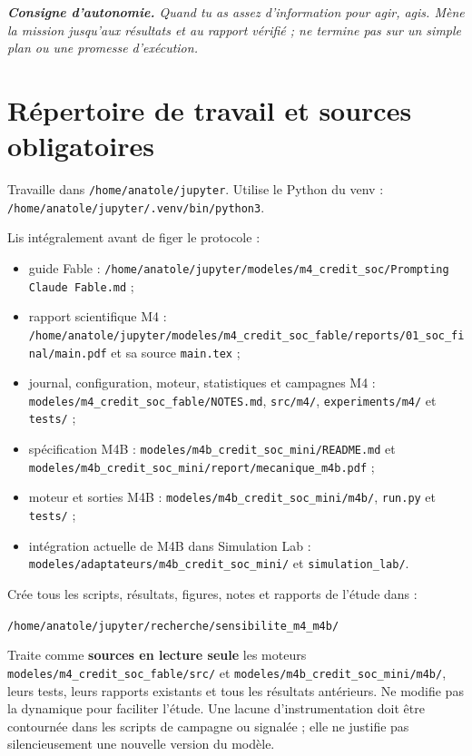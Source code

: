 \documentclass[11pt,a4paper]{article}
\newcommand{\code}[1]{\texttt{\color{navy}#1}}
\newcommand{\file}[1]{\nolinkurl{#1}}
\newcommand{\term}[1]{\textbf{\color{navy}#1}}
\newenvironment{notebox}
  {\begin{center}\begin{minipage}{0.90\textwidth}\color{navy}\itshape}
  {\end{minipage}\end{center}}
\begin{document}
\begin{notebox}
\textbf{Consigne d'autonomie.} Quand tu as assez d'information pour agir,
agis. Mène la mission jusqu'aux résultats et au rapport vérifié ; ne termine
pas sur un simple plan ou une promesse d'exécution.
\end{notebox}

\section{Répertoire de travail et sources obligatoires}

Travaille dans \file{/home/anatole/jupyter}. Utilise le Python du venv :
\file{/home/anatole/jupyter/.venv/bin/python3}.

Lis intégralement avant de figer le protocole :

\begin{itemize}
  \item guide Fable :
    \file{/home/anatole/jupyter/modeles/m4_credit_soc/Prompting Claude Fable.md} ;
  \item rapport scientifique M4 :
    \file{/home/anatole/jupyter/modeles/m4_credit_soc_fable/reports/01_soc_final/main.pdf}
    et sa source \code{main.tex} ;
  \item journal, configuration, moteur, statistiques et campagnes M4 :
    \file{modeles/m4_credit_soc_fable/NOTES.md}, \file{src/m4/},
    \file{experiments/m4/} et \file{tests/} ;
  \item spécification M4B : \file{modeles/m4b_credit_soc_mini/README.md} et
    \file{modeles/m4b_credit_soc_mini/report/mecanique_m4b.pdf} ;
  \item moteur et sorties M4B : \file{modeles/m4b_credit_soc_mini/m4b/},
    \file{run.py} et \file{tests/} ;
  \item intégration actuelle de M4B dans Simulation Lab :
    \file{modeles/adaptateurs/m4b_credit_soc_mini/} et
    \file{simulation_lab/}.
\end{itemize}

Crée tous les scripts, résultats, figures, notes et rapports de l'étude dans :

\begin{center}
  \file{/home/anatole/jupyter/recherche/sensibilite_m4_m4b/}
\end{center}

Traite comme \term{sources en lecture seule} les moteurs
\file{modeles/m4_credit_soc_fable/src/} et \file{modeles/m4b_credit_soc_mini/m4b/}, leurs
tests, leurs rapports existants et tous les résultats antérieurs. Ne modifie
pas la dynamique pour faciliter l'étude. Une lacune d'instrumentation doit
être contournée dans les scripts de campagne ou signalée ; elle ne justifie
pas silencieusement une nouvelle version du modèle.
\end{document}
